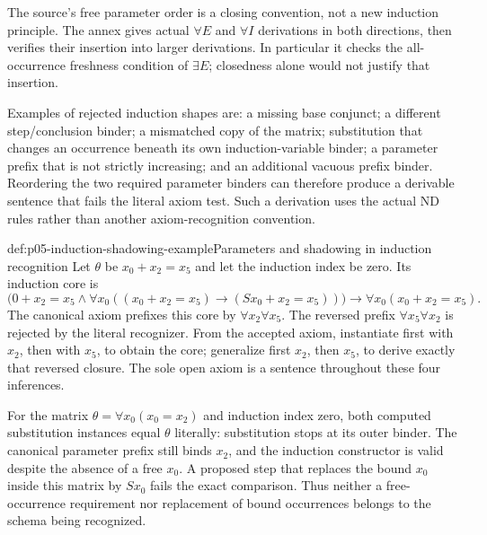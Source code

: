 The source's free parameter order is a closing convention, not a new
induction principle.  The annex gives actual \(\forall E\) and
\(\forall I\) derivations in both directions, then verifies their insertion
into larger derivations.  In particular it checks the all-occurrence
freshness condition of \(\exists E\); closedness alone would not justify
that insertion.

Examples of rejected induction shapes are: a missing base conjunct; a
different step/conclusion binder; a mismatched copy of the matrix; substitution
that changes an occurrence beneath its own induction-variable binder; a
parameter prefix that is not strictly increasing; and an additional vacuous
prefix binder.
Reordering the two required parameter binders can therefore produce a
derivable sentence that fails the literal axiom test.  Such a derivation
uses the actual ND rules rather than another axiom-recognition convention.

\begin{hbexample}{def:p05-induction-shadowing-example}{Parameters and shadowing in induction recognition}
Let \(\theta\) be \(x_0+x_2=x_5\) and let the induction index be zero.
Its induction core is
\[
 \bigl(0+x_2=x_5\land
  \forall x_0((x_0+x_2=x_5)\to(Sx_0+x_2=x_5))\bigr)
        \to\forall x_0(x_0+x_2=x_5).
\]
The canonical axiom prefixes this core by \(\forall x_2\forall x_5\).
The reversed prefix \(\forall x_5\forall x_2\) is rejected by the
literal recognizer.  From the accepted axiom, instantiate first with
\(x_2\), then with \(x_5\), to obtain the core; generalize first
\(x_2\), then \(x_5\), to derive exactly that reversed closure.
The sole open axiom is a sentence throughout these four inferences.

For the matrix \(\theta=\forall x_0(x_0=x_2)\) and induction index
zero, both computed substitution instances equal \(\theta\) literally:
substitution stops at its outer binder.  The canonical parameter prefix
still binds \(x_2\), and the induction constructor is valid despite
the absence of a free \(x_0\).  A proposed step that replaces the bound
\(x_0\) inside this matrix by \(Sx_0\) fails the exact comparison.
Thus neither a free-occurrence requirement nor replacement of bound
occurrences belongs to the schema being recognized.
\end{hbexample}

